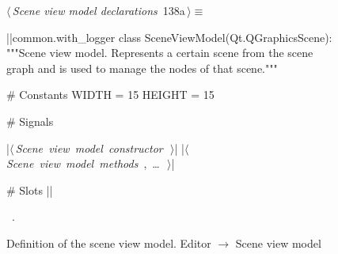 \documentclass[%
    a4paper,    %
    justified,  %
    nobib,      %
    openany     %
]{tufte-book}
\makeatletter
\renewcommand{\label}[1]{\@tufte@label{##1}}%
\makeatother
\begin{document}
\begin{figure}[!htbp]
\begin{flushleft} \small
\begin{minipage}{\linewidth}\label{scrap88}\raggedright\small
{} $\langle\,${\itshape Scene view model declarations}\nobreak\ {\footnotesize {138a}}$\,\rangle\equiv$
\vspace{-1ex}
\begin{pythoncode}
|\normalfont{}\fontfamily{}|common.with_logger
class SceneViewModel(Qt.QGraphicsScene):
    """Scene view model.
    Represents a certain scene from the scene graph and is used
    to manage the nodes of that scene."""

    # Constants
    WIDTH = 15
    HEIGHT = 15

    # Signals

    |\hbox{$\langle\,${\itshape Scene view model constructor}\nobreak\ {\footnotesize {}}$\,\rangle$}|
    |\hbox{$\langle\,${\itshape Scene view model methods}\nobreak\ {\footnotesize {}, \ldots\ }$\,\rangle$}|

    # Slots
|\NWsep|
\end{pythoncode}
\vspace{1.5ex}
\footnotesize
\begin{list}{}{\setlength{\itemsep}{-\parsep}\setlength{\itemindent}{-\leftmargin}}
\item \NWtxtMacroRefIn\ .

\item{}
\end{list}
\end{minipage}\vspace{4ex}
\end{flushleft}
\caption{Definition of the scene view model.
  \newline{}\newline{}Editor $\rightarrow$ Scene view model}
\end{figure}
\end{document}
